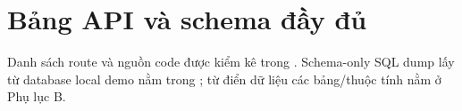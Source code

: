 \section{Bảng API và schema đầy đủ}
Danh sách route và nguồn code được kiểm kê trong \texttt{}. Schema-only SQL dump lấy từ database local demo nằm trong \texttt{}; từ điển dữ liệu các bảng/thuộc tính nằm ở Phụ lục B.

\begingroup
\renewcommand{\normalsize}{\scriptsize}
\scriptsize
\setlength{\tabcolsep}{3pt}

\endgroup
